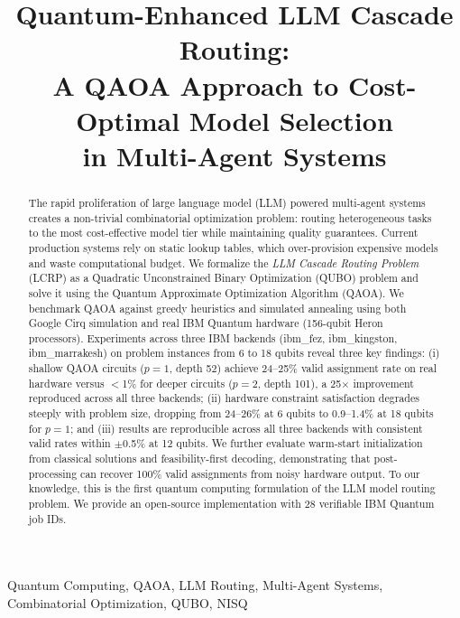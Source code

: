 \documentclass[conference]{IEEEtran}
\begin{document}
\title{Quantum-Enhanced LLM Cascade Routing:\\A QAOA Approach to Cost-Optimal Model Selection\\in Multi-Agent Systems}

\author{
}

\maketitle

\begin{abstract}
The rapid proliferation of large language model (LLM) powered multi-agent systems creates a non-trivial combinatorial optimization problem: routing heterogeneous tasks to the most cost-effective model tier while maintaining quality guarantees. Current production systems rely on static lookup tables, which over-provision expensive models and waste computational budget. We formalize the \emph{LLM Cascade Routing Problem} (LCRP) as a Quadratic Unconstrained Binary Optimization (QUBO) problem and solve it using the Quantum Approximate Optimization Algorithm (QAOA). We benchmark QAOA against greedy heuristics and simulated annealing using both Google Cirq simulation and real IBM Quantum hardware (156-qubit Heron processors). Experiments across three IBM backends (ibm\_fez, ibm\_kingston, ibm\_marrakesh) on problem instances from 6 to 18 qubits reveal three key findings: (i) shallow QAOA circuits ($p\!=\!1$, depth 52) achieve 24--25\% valid assignment rate on real hardware versus $<$1\% for deeper circuits ($p\!=\!2$, depth 101), a 25$\times$ improvement reproduced across all three backends; (ii) hardware constraint satisfaction degrades steeply with problem size, dropping from 24--26\% at 6 qubits to 0.9--1.4\% at 18 qubits for $p\!=\!1$; and (iii) results are reproducible across all three backends with consistent valid rates within $\pm$0.5\% at 12 qubits. We further evaluate warm-start initialization from classical solutions and feasibility-first decoding, demonstrating that post-processing can recover 100\% valid assignments from noisy hardware output. To our knowledge, this is the first quantum computing formulation of the LLM model routing problem. We provide an open-source implementation with 28 verifiable IBM Quantum job IDs.
\end{abstract}

\begin{IEEEkeywords}
Quantum Computing, QAOA, LLM Routing, Multi-Agent Systems, Combinatorial Optimization, QUBO, NISQ
\end{IEEEkeywords}
\end{document}
